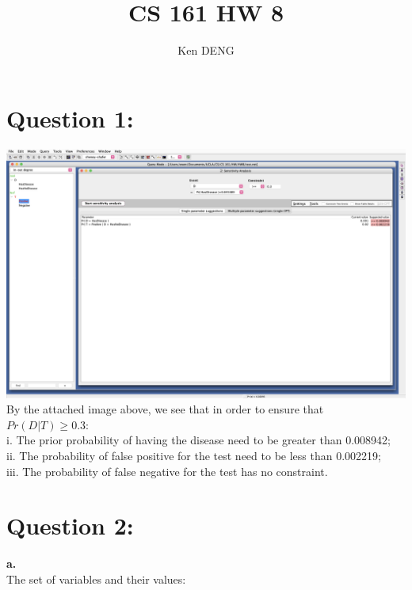 \documentclass[11pt, oneside]{article}   	%
\title{CS 161 HW 8}
\author{Ken DENG}
\begin{document}
\maketitle

\section{Question 1:}

\includegraphics[scale=0.25]{Q1}\\

\noindent{}By the attached image above, we see that in order to ensure that $Pr(D|T) \geq 0.3$:\\
\phantom{aaaa}i. The prior probability of having the disease need to be greater than 0.008942;\\
\phantom{aaaa}ii. The probability of false positive for the test need to be less than 0.002219;\\
\phantom{aaaa}iii. The probability of false negative for the test has no constraint.

\pagebreak 
\section{Question 2:}

\noindent{}\textbf{a.}\\

\noindent{}The set of variables and their values:\\
\end{document}
